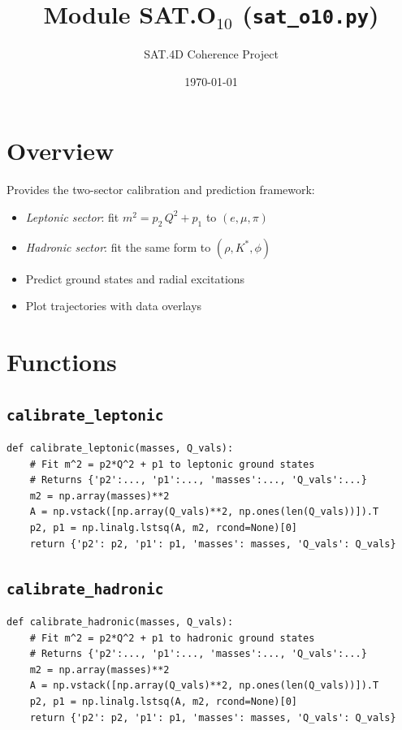\documentclass[12pt]{article}
\begin{document}
\title{Module SAT.O$_{10}$ (\texttt{sat\_o10.py})}
\author{SAT.4D Coherence Project}
\date{\today}
\maketitle

\section*{Overview}
Provides the two-sector calibration and prediction framework:
\begin{itemize}
  \item \emph{Leptonic sector}: fit \(m^2 = p_2\,Q^2 + p_1\) to \((e,\mu,\pi)\)
  \item \emph{Hadronic sector}: fit the same form to \((\rho,K^*,\phi)\)
  \item Predict ground states and radial excitations
  \item Plot trajectories with data overlays
\end{itemize}

\section{Functions}

\subsection{\texttt{calibrate\_leptonic}}
\begin{verbatim}
def calibrate_leptonic(masses, Q_vals):
    # Fit m^2 = p2*Q^2 + p1 to leptonic ground states
    # Returns {'p2':..., 'p1':..., 'masses':..., 'Q_vals':...}
    m2 = np.array(masses)**2
    A = np.vstack([np.array(Q_vals)**2, np.ones(len(Q_vals))]).T
    p2, p1 = np.linalg.lstsq(A, m2, rcond=None)[0]
    return {'p2': p2, 'p1': p1, 'masses': masses, 'Q_vals': Q_vals}
\end{verbatim}

\subsection{\texttt{calibrate\_hadronic}}
\begin{verbatim}
def calibrate_hadronic(masses, Q_vals):
    # Fit m^2 = p2*Q^2 + p1 to hadronic ground states
    # Returns {'p2':..., 'p1':..., 'masses':..., 'Q_vals':...}
    m2 = np.array(masses)**2
    A = np.vstack([np.array(Q_vals)**2, np.ones(len(Q_vals))]).T
    p2, p1 = np.linalg.lstsq(A, m2, rcond=None)[0]
    return {'p2': p2, 'p1': p1, 'masses': masses, 'Q_vals': Q_vals}
\end{verbatim}
\end{document}
